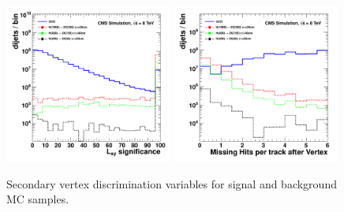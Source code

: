 \begin{enumerate}
\begin{figure}
\includegraphics[width=0.49\textwidth]{plots/discrimination/disc_lxysig.pdf}
\includegraphics[width=0.49\textwidth]{plots/discrimination/disc_NAvgMissHitsAfterVert.pdf}
\caption{Secondary vertex discrimination variables for signal and background MC samples.\label{fig:discvtx}}

\end{figure}


\end{enumerate}
